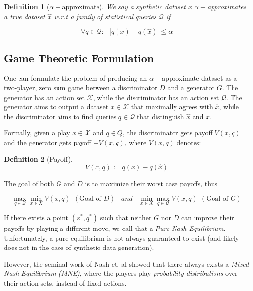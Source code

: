\documentclass[]{article}
\newcommand{\X}{\mathcal{X}}
\newcommand{\Q}{\mathcal{Q}}
\newtheorem{definition}{Definition}[section]
\theoremstyle{definition}
\begin{document}
\begin{definition}[$\alpha-$approximate]
    We say a synthetic dataset $x$ $\alpha-$approximates a true dataset $\hat x$ w.r.t a family of statistical queries $\Q$ if

    \begin{equation}
        \forall q \in \Q: ~~~ |q(x) - q(\hat x)| \leq \alpha
    \end{equation}
\end{definition}

\subsection{Game Theoretic Formulation}

One can formulate the problem of producing an $\alpha-$approximate dataset as a two-player, zero sum game \cite{HRU13} between a discriminator $D$ and a generator $G$. The generator has an action set $\X$, while the discriminator has an action set $\Q$. The generator aims to output a dataset $x \in \X$ that maximally agrees with $\hat x$, while the discriminator aims to find queries $q \in \Q$ that distinguish $\hat x$ and $x$.

Formally, given a play $x \in \X$ and $q \in Q$, the discriminator gets payoff $V(x,q)$ and the generator gets payoff $-V(x,q)$, where $V(x,q)$ denotes:

\begin{definition}[Payoff]
    \begin{equation}
        V(x,q) := q(x) - q(\hat x)
    \end{equation}
\end{definition}

The goal of both $G$ and $D$ is to maximize their worst case payoffs, thus

\begin{equation}
    \max_{q \in \Q} \min_{x \in X} V(x,q) ~~ (\text{Goal of } D) ~~~~ and ~~~~ 
    \min_{x \in X} \max_{q \in \Q} V(x,q) ~~ (\text{Goal of } G) 
\end{equation}

If there exists a point $(x^*, q^*)$ such that neither $G$ nor $D$ can improve their payoffs by playing a different move, we call that a \emph{Pure Nash Equilibrium}. Unfortunately, a pure equilibrium is not always guaranteed to exist (and likely does not in the case of synthetic data generation). 

However, the seminal work of Nash et. al showed that there always exists a \emph{Mixed Nash Equilibrium (MNE)}, where the players play \emph{probability distributions} over their action sets, instead of fixed actions. 
\end{document}
